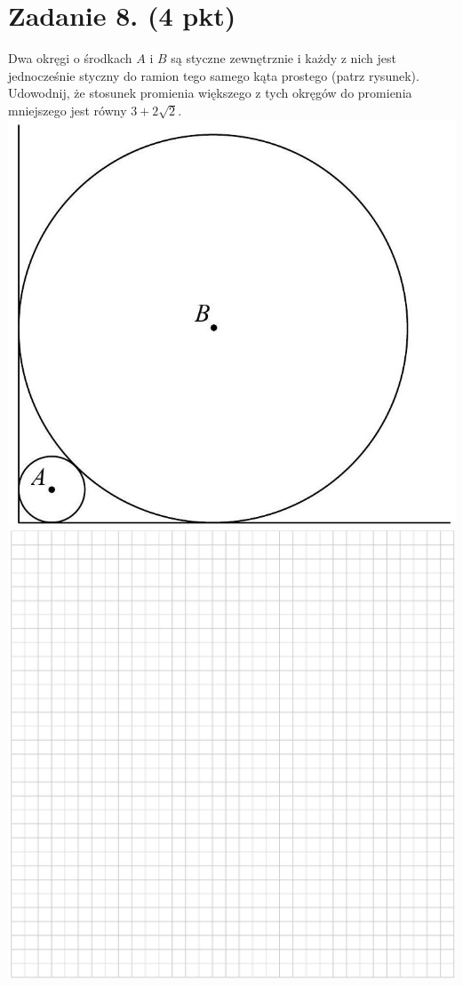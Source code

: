 \documentclass[10pt]{article}
\begin{document}
\section*{Zadanie 8. (4 pkt)}
Dwa okręgi o środkach \(A\) i \(B\) są styczne zewnętrznie i każdy z nich jest jednocześnie styczny do ramion tego samego kąta prostego (patrz rysunek). Udowodnij, że stosunek promienia większego z tych okręgów do promienia mniejszego jest równy \(3+2 \sqrt{2}\).\\
\includegraphics[max width=\textwidth, center]{2024_11_21_8bf32a7596bd08ca7a9fg-10}\\
\includegraphics[max width=\textwidth, center]{2024_11_21_8bf32a7596bd08ca7a9fg-10(1)}\\
\end{document}
